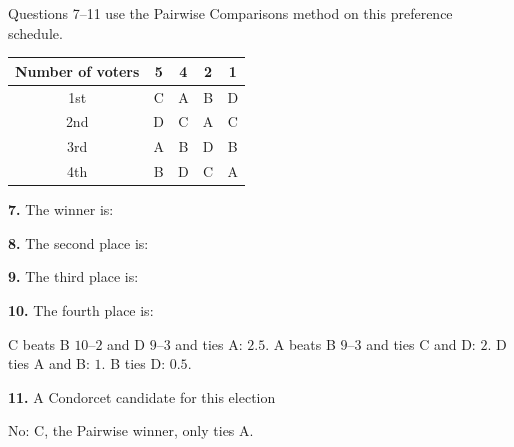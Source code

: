 \documentclass[12pt]{ximera}
\begin{document}
\begin{problem}
Questions 7--11 use the Pairwise Comparisons method on this preference schedule.
\begin{center}
\begin{tabular}{c|cccc}
Number of voters & 5 & 4 & 2 & 1\\\hline
1st & C & A & B & D\\
2nd & D & C & A & C\\
3rd & A & B & D & B\\
4th & B & D & C & A
\end{tabular}
\end{center}

\begin{prompt}
\textbf{7.} The winner is:
\begin{multipleChoice}
\end{multipleChoice}
\end{prompt}

\begin{prompt}
\textbf{8.} The second place is:
\begin{multipleChoice}
\end{multipleChoice}
\end{prompt}

\begin{prompt}
\textbf{9.} The third place is:
\begin{multipleChoice}
\end{multipleChoice}
\end{prompt}

\begin{prompt}
\textbf{10.} The fourth place is:
\begin{multipleChoice}
\end{multipleChoice}
\begin{feedback}
C beats B $10$--$2$ and D $9$--$3$ and ties A: $2.5$. A beats B $9$--$3$ and ties C and D: $2$. D ties A and B: $1$. B ties D: $0.5$.
\end{feedback}
\end{prompt}

\begin{prompt}
\textbf{11.} A Condorcet candidate for this election
\begin{multipleChoice}
\end{multipleChoice}
\begin{feedback}
No: C, the Pairwise winner, only ties A.
\end{feedback}
\end{prompt}
\end{problem}
\end{document}
